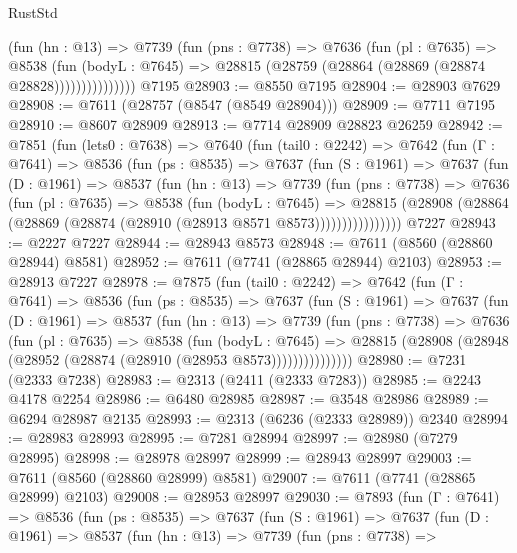 \begin{lexlean}{RustStd}
\begin{coremodule}
                  (fun (hn : @13) =>
                  @7739
                    (fun (pns : @7738) =>
                    @7636
                      (fun (pl : @7635) =>
                      @8538
                        (fun (bodyL : @7645) =>
                        @28815 (@28759 (@28864 (@28869 (@28874 @28828)))))))))))))))
    @7195
@28903 := @8550 @7195
@28904 := @28903 @7629
@28908 := @7611 (@28757 (@8547 (@8549 @28904)))
@28909 := @7711 @7195
@28910 := @8607 @28909
@28913 := @7714 @28909 @28823 @26259
@28942 := @7851
    (fun (lets0 : @7638) =>
    @7640
      (fun (tail0 : @2242) =>
      @7642
        (fun (Γ : @7641) =>
        @8536
          (fun (ps : @8535) =>
          @7637
            (fun (S : @1961) =>
            @7637
              (fun (D : @1961) =>
              @8537
                (fun (hn : @13) =>
                @7739
                  (fun (pns : @7738) =>
                  @7636
                    (fun (pl : @7635) =>
                    @8538
                      (fun (bodyL : @7645) =>
                      @28815
                        (@28908 (@28864 (@28869 (@28874 (@28910 (@28913 @8571 @8573))))))))))))))))
    @7227
@28943 := @2227 @7227
@28944 := @28943 @8573
@28948 := @7611 (@8560 (@28860 @28944) @8581)
@28952 := @7611 (@7741 (@28865 @28944) @2103)
@28953 := @28913 @7227
@28978 := @7875
    (fun (tail0 : @2242) =>
    @7642
      (fun (Γ : @7641) =>
      @8536
        (fun (ps : @8535) =>
        @7637
          (fun (S : @1961) =>
          @7637
            (fun (D : @1961) =>
            @8537
              (fun (hn : @13) =>
              @7739
                (fun (pns : @7738) =>
                @7636
                  (fun (pl : @7635) =>
                  @8538
                    (fun (bodyL : @7645) =>
                    @28815 (@28908 (@28948 (@28952 (@28874 (@28910 (@28953 @8573)))))))))))))))
@28980 := @7231 (@2333 @7238)
@28983 := @2313 (@2411 (@2333 @7283))
@28985 := @2243 @4178 @2254
@28986 := @6480 @28985
@28987 := @3548 @28986
@28989 := @6294 @28987 @2135
@28993 := @2313 (@6236 (@2333 @28989)) @2340
@28994 := @28983 @28993
@28995 := @7281 @28994
@28997 := @28980 (@7279 @28995)
@28998 := @28978 @28997
@28999 := @28943 @28997
@29003 := @7611 (@8560 (@28860 @28999) @8581)
@29007 := @7611 (@7741 (@28865 @28999) @2103)
@29008 := @28953 @28997
@29030 := @7893
    (fun (Γ : @7641) =>
    @8536
      (fun (ps : @8535) =>
      @7637
        (fun (S : @1961) =>
        @7637
          (fun (D : @1961) =>
          @8537
            (fun (hn : @13) =>
            @7739
              (fun (pns : @7738) =>

\end{coremodule}
\end{lexlean}
